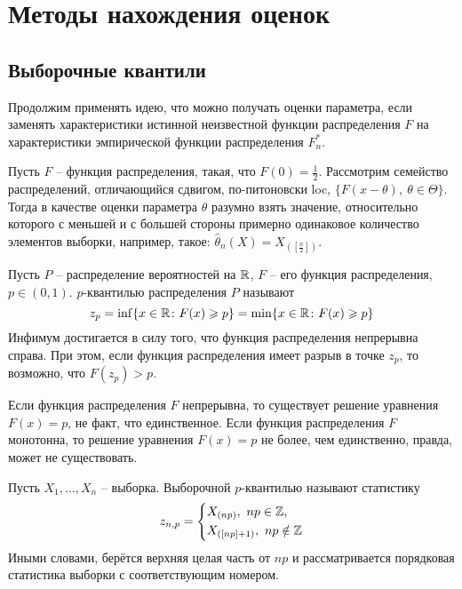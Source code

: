 \section{Методы нахождения оценок}

\subsection{Выборочные квантили}

\begin{note}
    Продолжим применять идею, что можно получать оценки параметра, если заменять характеристики истинной неизвестной функции распределения $F$ на характеристики эмпирической функции распределения $F_n^*$.
\end{note}

\begin{example}
    Пусть $F$ -- функция распределения, такая, что $F(0) = \frac{1}{2}$. Рассмотрим семейство распределений, отличающийся сдвигом, по-питоновски loc, $\{F(x-\theta),\ \theta \in \Theta\}$. Тогда в качестве оценки параметра $\theta$ разумно взять значение, относительно которого с меньшей и с большей стороны примерно одинаковое количество элементов выборки, например, такое: $\hat{\theta}_n(X) = X_{([\frac{n}{2}])}$.
\end{example}

\begin{definition}
    Пусть $P$ -- распределение вероятностей на $\mathbb{R}$, $F$ -- его функция распределения, $p \in (0, 1)$. $p$-квантилью распределения $P$ называют
    \[
        z_p = \inf \{x \in \mathbb{R} \colon F(x) \geqslant p\} = \min \{x \in \mathbb{R} \colon F(x) \geqslant p\}
    \]
    Инфимум достигается в силу того, что функция распределения непрерывна справа. При этом, если функция распределения имеет разрыв в точке $z_p$, то возможно, что $F(z_p) > p$.
\end{definition}

\begin{note}
    Если функция распределения $F$ непрерывна, то существует решение уравнения $F(x) = p$, не факт, что единственное. Если функция распределения $F$ монотонна, то решение уравнения $F(x) = p$ не более, чем единственно, правда, может не существовать.
\end{note}

\begin{definition}
    Пусть $X_1, \dots, X_n$ -- выборка. Выборочной $p$-квантилью называют статистику
    \[
        z_{n,p} = \left\{\begin{aligned}
            & X_{(np)},\ np \in \mathbb{Z},
            \\
            & X_{([np]+1)},\ np \notin \mathbb{Z}
        \end{aligned}\right.
    \]
    Иными словами, берётся верхняя целая часть от $np$ и рассматривается порядковая статистика выборки с соответствующим номером.
\end{definition}


